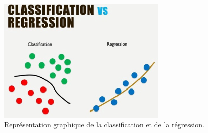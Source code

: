 \begin{figure}
  \centering
  \includegraphics[width=8cm]{./Chapitre2/figures/classifVSreg.png}
  \caption{Représentation graphique de la classification et de la régression.}
  \label{fig:classifVSreg}
\end{figure}
